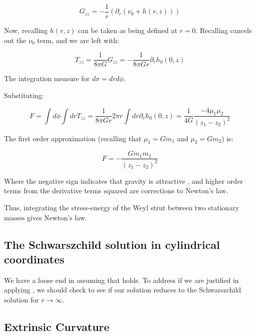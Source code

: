 \documentclass{article}
\begin{document}
\begin{equation}
\label{eq:G_zz_reduced}
G_{zz}=-\frac{1}{r}\left(\partial_{r}\left(\nu_0+h(r,z)\right)\right) 
\end{equation}

Now, recalling  $h(r,z)$ can be taken as being defined at $r=0$. Recalling  cancels out the $\nu_0$ term, and we are left with:

\begin{equation}
\label{eq:T_zz}
T_{zz}=\frac{1}{8\pi G}G_{zz}=-\frac{1}{8\pi Gr}\partial_{r}h_0(0,z)
\end{equation}

The integration measure for  $d\sigma=drd\phi$.

Substituting:

\begin{equation}
F=\int d\phi\int dr T_{zz}=\frac{1}{8\pi Gr}2\pi r\int dr\partial_{r}h_0(0,z)=\frac{1}{4G}\frac{-4\mu_1\mu_2}{\left(z_1-z_2\right)^2}
\end{equation}

The first order approximation (recalling that $\mu_{1}=Gm_{1}$ and $\mu_{2}=Gm_{2}$) is:

\begin{equation}
F=-\frac{Gm_{1}m_{2}}{\left(z_{1}-z_{2}\right)^{2}}
\end{equation}

Where the negative sign indicates that gravity is attractive \cite{carroll2003spacetime}, and higher order terms from the derivative terms squared are corrections to Newton's law.

Thus, integrating the stress-energy of the Weyl strut between two stationary masses gives Newton's law.

\subsection{The Schwarszchild solution in cylindrical coordinates}

We have a loose end in assuming that  holds. To address if we are justified in applying , we should check to see if our solution reduces to the Schwarszchild solution for $r\rightarrow\infty$.

\subsection{Extrinsic Curvature}
\end{document}
